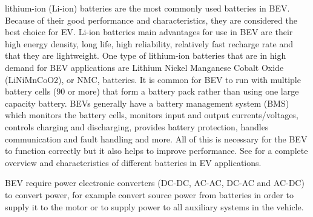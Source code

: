 lithium-ion (Li-ion) batteries are the most commonly used batteries in BEV\:\cite{hannanStateoftheArtEnergyManagement2018}\cite{un-noorComprehensiveStudyKey2017}\cite{chauEVPowertrainConfigurations2014}\cite{kumarDevelopmentSchemeKey2017}\cite{tahaComparativeAnalysisSingle2022}\cite{zubiLithiumionBatteryState2018}. Because of their good performance and characteristics, they are considered the best choice for EV\:\cite{hannanStateoftheArtEnergyManagement2018}. Li-ion batteries main advantages for use in BEV are their high energy density, long life, high reliability, relatively fast recharge rate and that they are lightweight\:\cite{hannanStateoftheArtEnergyManagement2018}\cite{kumarDevelopmentSchemeKey2017}\cite{zubiLithiumionBatteryState2018}. One type of lithium-ion batteries that are in high demand for BEV applications are Lithium Nickel Manganese Cobalt Oxide (LiNiMnCoO2), or NMC, batteries\:\cite{hannanStateoftheArtEnergyManagement2018}\cite{zubiLithiumionBatteryState2018}. It is common for BEV to run with multiple battery cells (90 or more) that form a battery pack rather than using one large capacity battery\:\cite{hannanStateoftheArtEnergyManagement2018}. BEVs generally have a battery management system (BMS) which monitors the battery cells, monitors input and output currents/voltages, controls charging and discharging, provides battery protection, handles communication and fault handling and more\:\cite{hannanStateoftheArtEnergyManagement2018}\cite{zubiLithiumionBatteryState2018}. All of this is necessary for the BEV to function correctly but it also helps to improve performance\:\cite{hannanStateoftheArtEnergyManagement2018}\cite{zubiLithiumionBatteryState2018}.
See\:\cite{zubiLithiumionBatteryState2018} for a complete overview and characteristics of different batteries in EV applications.

BEV require power electronic converters (DC-DC, AC-AC, DC-AC and AC-DC) to convert power, for example convert source power from batteries in order to supply it to the motor or to supply power to all auxiliary systems in the vehicle\:\cite{khajepourElectricHybridVehicles2014}\cite{un-noorComprehensiveStudyKey2017}.

